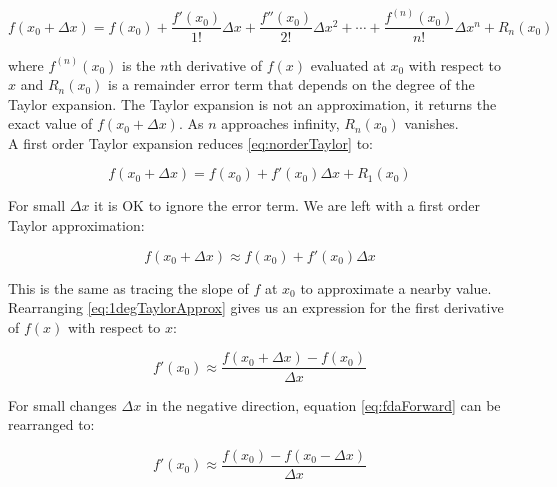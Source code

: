 { \begin{equation}\label{eq:norderTaylor}
  f(x_{0} + \Delta  x) = f(x_{0}) + \frac{f'(x_{0})}{1!}\Delta  x + \frac{f''(x_{0})}{2!}\Delta  x^{2} + \cdots  + \frac{f^{(n)}(x_{0})}{n!}\Delta  x^{n} + R_{n}(x_{0})
  \end{equation}
  
  where $f^{(n)}(x_{0})$ is the $n$th derivative of $f(x)$ evaluated at $x_{0}$ with respect to $x$ and $R_{n}(x_{0})$ is a remainder error term that depends on the degree of the Taylor expansion.  The Taylor expansion is not an approximation, it returns the exact value of $ f(x_{0} + \Delta  x)$.  As $n$ approaches infinity, $R_{n}(x_{0})$ vanishes.\\
  

A first order Taylor expansion reduces \ref{eq:norderTaylor} to:
  
 \begin{equation}\label{eq:1degTaylor}
  f(x_{0} + \Delta  x) = f(x_{0}) + f'(x_{0})\Delta x + R_{1}(x_{0})
  \end{equation}
  
  For small $\Delta  x$ it is OK to ignore the error term.  We are left with a first order Taylor approximation:
  
   \begin{equation}\label{eq:1degTaylorApprox}
  f(x_{0} + \Delta  x) \approx f(x_{0}) + f'(x_{0})\Delta x
  \end{equation}
  
This is the same as tracing the slope of $f$ at $x_{0}$ to approximate a nearby value.  Rearranging \ref{eq:1degTaylorApprox} gives us an expression for the first derivative of $f(x)$ with respect to $x$:

 \begin{equation}\label{eq:fdaForward}
 f'(x_{0}) \approx \frac{f(x_{0} + \Delta  x) - f(x_{0})}{\Delta  x}
  \end{equation}
  
  For small changes $\Delta  x$ in the negative direction, equation \ref{eq:fdaForward} can be rearranged to:

 \begin{equation}\label{eq:fdaBackward}
 f'(x_{0}) \approx \frac{f(x_{0}) - f(x_{0} - \Delta  x)}{\Delta  x}
  \end{equation}
  
}
